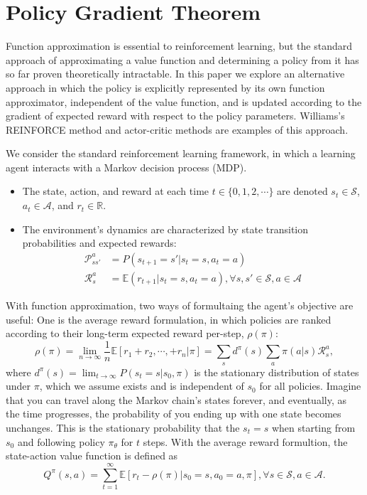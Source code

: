 \section{Policy Gradient Theorem}

Function approximation is essential to reinforcement learning, but the standard approach of approximating a value function and determining a policy from it has so far proven theoretically intractable. In this paper we explore an alternative approach in which the policy is explicitly represented by its own function approximator, independent of the value function, and is updated according to the gradient of expected reward with respect to the policy parameters. Williams's REINFORCE method and actor-critic methods are examples of this approach.


We consider the standard reinforcement learning framework, in which a learning agent interacts with a Markov decision process (MDP). 

\begin{itemize}
	\item The state, action, and reward at each time $t\in \{0, 1, 2, \cdots\}$ are denoted $s_t\in \mathcal{S}$, $a_t\in \mathcal{A}$, and $r_t\in \mathbb{R}$.
	\item The environment's dynamics are characterized by state transition probabilities and expected rewards:
		\begin{align*}
			\mathcal{P}_{ss'}^a &= P(s_{t+1}=s'|s_t=s,a_t=a)\\
			\mathcal{R}_{s}^a &= \mathbb{E}(r_{t+1}|s_t=s,a_t=a), \forall s, s' \in \mathcal{S}, a\in \mathcal{A}
		\end{align*}
\end{itemize}

With function approximation, two ways of formultaing the agent's objective are useful: One is the average reward formulation, in which policies are ranked according to their long-term expected reward per-step, $\rho(\pi)$:
$$\rho(\pi) = \lim_{n\to\infty} \frac{1}{n}\mathbb{E}[r_1 + r_2,\cdots,+r_n|\pi] = \sum_s d^\pi(s)\sum_a \pi(a|s)\mathcal{R}_s^a,$$
where $d^\pi(s) = \lim_{t\to \infty}P(s_t=s|s_0,\pi)$ is the stationary distribution of states under $\pi$, which we assume exists and is independent of $s_0$ for all policies. Imagine that you can travel along the Markov chain's states forever, and eventually, as the time progresses, the probability of you ending up with one state becomes unchanges. This is the stationary probability that the $s_t=s$ when starting from $s_0$ and following policy $\pi_\theta$ for $t$ steps. With the average reward formultion, the state-action value function is defined as 
$$Q^\pi(s,a) = \sum_{t=1}^{\infty}\mathbb{E}[r_t-\rho(\pi)|s_0=s, a_0=a, \pi], \forall s\in \mathcal{S}, a\in \mathcal{A}.$$


